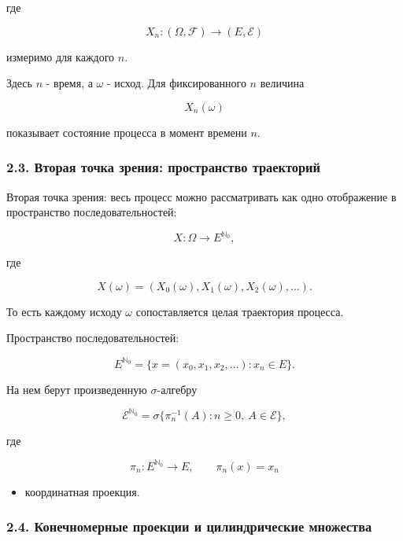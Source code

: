 \documentclass[
  11pt,
  a4paper,
]{article}
\providecommand{\tightlist}{%
  \setlength{\itemsep}{0pt}\setlength{\parskip}{0pt}}
\begin{document}
где

\[
X_n:(\Omega,\mathcal F)\to(E,\mathcal E)
\]

измеримо для каждого \(n\).

Здесь \(n\) - время, а \(\omega\) - исход. Для фиксированного \(n\)
величина

\[
X_n(\omega)
\]

показывает состояние процесса в момент времени \(n\).

\subsubsection{2.3. Вторая точка зрения: пространство
траекторий}\label{ux432ux442ux43eux440ux430ux44f-ux442ux43eux447ux43aux430-ux437ux440ux435ux43dux438ux44f-ux43fux440ux43eux441ux442ux440ux430ux43dux441ux442ux432ux43e-ux442ux440ux430ux435ux43aux442ux43eux440ux438ux439}

Вторая точка зрения: весь процесс можно рассматривать как одно
отображение в пространство последовательностей:

\[
X:\Omega\to E^{\mathbb N_0},
\]

где

\[
X(\omega)=(X_0(\omega),X_1(\omega),X_2(\omega),\ldots).
\]

То есть каждому исходу \(\omega\) сопоставляется целая траектория
процесса.

Пространство последовательностей:

\[
E^{\mathbb N_0}
=
\{x=(x_0,x_1,x_2,\ldots):x_n\in E\}.
\]

На нем берут произведенную \(\sigma\)-алгебру

\[
\mathcal E^{\mathbb N_0}
=
\sigma\{\pi_n^{-1}(A):n\ge0,\ A\in\mathcal E\},
\]

где

\[
\pi_n:E^{\mathbb N_0}\to E,
\qquad
\pi_n(x)=x_n
\]

\begin{itemize}
\tightlist
\item
  координатная проекция.
\end{itemize}

\subsubsection{2.4. Конечномерные проекции и цилиндрические
множества}\label{ux43aux43eux43dux435ux447ux43dux43eux43cux435ux440ux43dux44bux435-ux43fux440ux43eux435ux43aux446ux438ux438-ux438-ux446ux438ux43bux438ux43dux434ux440ux438ux447ux435ux441ux43aux438ux435-ux43cux43dux43eux436ux435ux441ux442ux432ux430}
\end{document}
